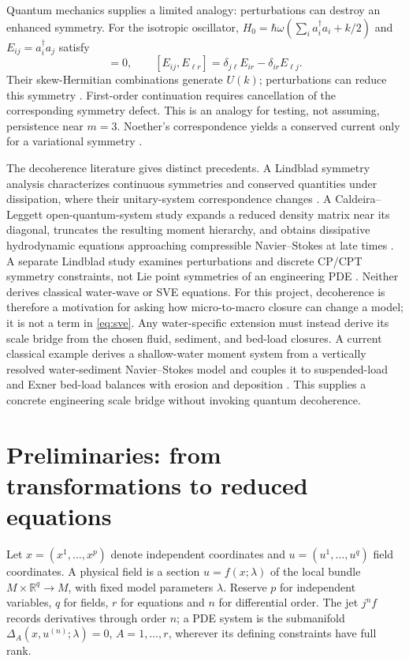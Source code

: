 \documentclass[11pt]{article}
\begin{document}
Quantum mechanics supplies a limited analogy: perturbations can destroy an
enhanced symmetry. For the isotropic oscillator,
$H_0=\hbar\omega(\sum_i a_i^\dagger a_i+k/2)$ and
$E_{ij}=a_i^\dagger a_j$ satisfy
\begin{equation}
[H_0,E_{ij}]=0,\qquad
[E_{ij},E_{\ell r}]=\delta_{j\ell}E_{ir}-\delta_{ir}E_{\ell j}.
\end{equation}
Their skew-Hermitian combinations generate $U(k)$; perturbations can reduce
this symmetry \cite{tong}. First-order continuation requires cancellation of
the corresponding symmetry defect. This is an analogy for testing, not
assuming, persistence near $m=3$. Noether's correspondence yields a conserved
current only for a variational symmetry \cite{noether}.

The decoherence literature gives distinct precedents. A Lindblad symmetry
analysis characterizes continuous symmetries and conserved quantities under
dissipation, where their unitary-system correspondence changes
\cite{lindbladsy}. A Caldeira--Leggett open-quantum-system study expands a
reduced density matrix near its diagonal,
truncates the resulting moment hierarchy, and obtains dissipative hydrodynamic
equations approaching compressible Navier--Stokes at late times
\cite{decohydro}. A separate Lindblad study examines perturbations and
discrete CP/CPT symmetry constraints, not Lie point symmetries of an engineering
PDE \cite{lindblad}. Neither derives classical water-wave or SVE equations.
For this project, decoherence is therefore a motivation for asking how
micro-to-macro closure can change a model; it is not a term in \eqref{eq:sve}.
Any water-specific extension must instead derive its scale bridge from the
chosen fluid, sediment, and bed-load closures.
A current classical example derives a shallow-water moment system from a
vertically resolved water-sediment Navier--Stokes model and couples it to
suspended-load and Exner bed-load balances with erosion and deposition
\cite{parvin}. This supplies a concrete engineering scale bridge without
invoking quantum decoherence.

\section{Preliminaries: from transformations to reduced equations}
Let $x=(x^1,\ldots,x^p)$ denote independent coordinates and
$u=(u^1,\ldots,u^q)$ field coordinates. A physical field is a section
$u=f(x;\lambda)$ of the local bundle $M\times\mathbb R^q\to M$, with fixed model
parameters $\lambda$. Reserve $p$ for independent variables, $q$ for fields,
$r$ for equations and $n$ for differential order. The jet $j^nf$ records
derivatives through order $n$; a PDE system is the submanifold
$\Delta_A(x,u^{(n)};\lambda)=0$, $A=1,\ldots,r$, wherever its defining
constraints have full rank.
\end{document}
